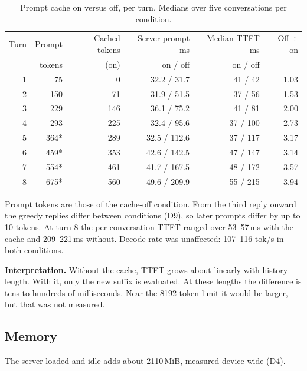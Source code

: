 \documentclass[11pt,a4paper]{article}
\newcommand{\field}[1]{\textbf{#1}\quad}
\begin{document}
\begin{table}[H]
\centering
\small
\caption{Prompt cache on versus off, per turn. Medians over five conversations per
  condition.}
\label{tab:cache}
\begin{tabular}{@{}rrrrrr@{}}
\toprule
Turn & Prompt & Cached tokens & Server prompt ms & Median TTFT ms & Off $\div$ on \\
     & tokens & (on)          & on / off         & on / off       &  \\
\midrule
1 & 75 & 0 & 32.2 / 31.7 & 41 / 42 & 1.03 \\
2 & 150 & 71 & 31.9 / 51.5 & 37 / 56 & 1.53 \\
3 & 229 & 146 & 36.1 / 75.2 & 41 / 81 & 2.00 \\
4 & 293 & 225 & 32.4 / 95.6 & 37 / 100 & 2.73 \\
5 & 364* & 289 & 32.5 / 112.6 & 37 / 117 & 3.17 \\
6 & 459* & 353 & 42.6 / 142.5 & 47 / 147 & 3.14 \\
7 & 554* & 461 & 41.7 / 167.5 & 48 / 172 & 3.57 \\
8 & 675* & 560 & 49.6 / 209.9 & 55 / 215 & 3.94 \\
\bottomrule
\end{tabular}

\begin{minipage}{0.92\textwidth}
{\small * Prompt tokens are those of the cache-off condition. From the third reply onward
the greedy replies differ between conditions (D9), so later prompts differ by up to 10
tokens. At turn 8 the per-conversation TTFT ranged over 53--57\,ms with the cache and
209--221\,ms without. Decode rate was unaffected: 107--116 tok/s in both conditions.\par}
\end{minipage}
\end{table}



\field{Interpretation.} Without the cache, TTFT grows about linearly with history length.
With it, only the new suffix is evaluated. At these lengths the difference is tens to
hundreds of milliseconds. Near the 8192-token limit it would be larger, but that was not
measured.

\subsection{Memory}

The server loaded and idle adds about 2110\,MiB, measured device-wide (D4).
\end{document}
